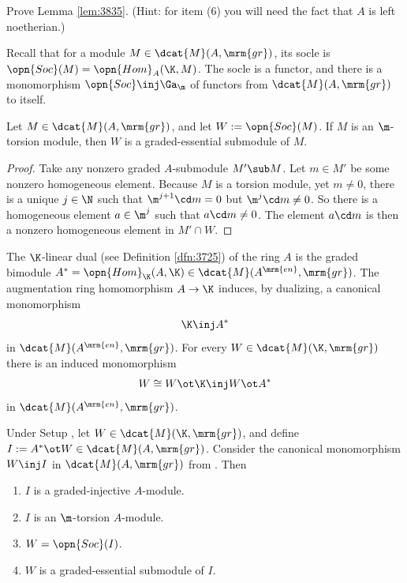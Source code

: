 \begin{exer} \label{exer:3810}
Prove Lemma \ref{lem:3835}. (Hint: for item (6) you will need the fact that $A$ 
is left noetherian.)
\end{exer}

Recall that for a  module $M \in \dcat{M}(A, \mrm{gr})$, 
its socle is $\opn{Soc}(M) = \opn{Hom}_A(\K, M)$.
The socle is a functor, and there is a monomorphism 
$\opn{Soc} \inj \Ga_{\m}$ 
of functors from $\dcat{M}(A, \mrm{gr})$ to itself.

\begin{lem} \label{lem:5095}
Let $M \in \dcat{M}(A, \mrm{gr})$, and let 
$W := \opn{Soc}(M)$. If $M$ is an $\m$-torsion module, then $W$ is a 
graded-essential submodule of $M$.  
\end{lem}

\begin{proof}
Take any nonzero graded $A$-submodule 
$M' \sub M$. Let $m \in M'$ be some nonzero homogeneous element.
Because $M$ is a torsion module, yet $m \neq 0$, 
there is a unique $j \in \N$ such that 
$\m^{j + 1} \cd m  = 0$ but $\m^{j} \cd m \neq 0$. 
So there is a homogeneous element $a \in \m^{j}$ such that $a \cd m \neq 0$. 
The element $a \cd m$ is then a nonzero homogeneous element in 
$M' \cap W$. 
\end{proof}

The $\K$-linear dual (see Definition \ref{dfn:3725}) of the ring $A$ is the 
graded bimodule 
$A^* = \opn{Hom}_{\K}(A, \K) \in \dcat{M}(A^{\mrm{en}}, \mrm{gr})$.
The augmentation ring homomorphism $A \to \K$ induces, by dualizing, a 
canonical monomorphism 
\begin{equation} \label{eqn:4810}
\K \inj A^* 
\end{equation}
in $\dcat{M}(A^{\mrm{en}}, \mrm{gr})$.
For every $W \in \dcat{M}(\K, \mrm{gr})$ there is an induced monomorphism 
\begin{equation} \label{eqn:5095}
W \cong W \ot \K \inj W \ot A^*  
\end{equation}
in $\dcat{M}(A^{\mrm{en}}, \mrm{gr})$.

\begin{lem} \label{lem:5100}   
Under Setup \tup{\ref{setup:3755}}, let $W \in \dcat{M}(\K, \mrm{gr})$, and 
define 
$I := A^* \ot W \in \dcat{M}(A, \mrm{gr})$.
Consider the canonical monomorphism $W \inj I$ 
in $\dcat{M}(A, \mrm{gr})$ from \tup{(\ref{eqn:5095})}. 
Then\tup{:}
\begin{enumerate}
\item $I$ is a graded-injective $A$-module.

\item $I$ is an $\m$-torsion $A$-module.

\item $W = \opn{Soc}(I)$.

\item $W$ is a graded-essential submodule of $I$. 
\end{enumerate}
\end{lem}

